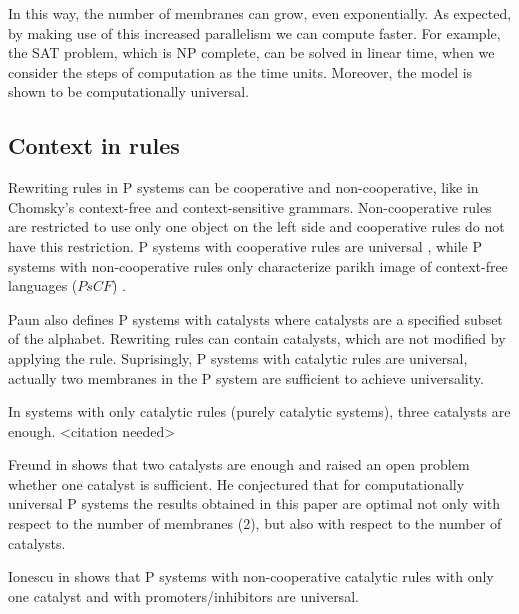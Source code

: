 In this way, the number of membranes can grow, even exponentially. As expected, by making use of this increased parallelism we can compute faster.
For example, the SAT problem, which is NP complete, can be solved in linear time, when we consider the steps of computation as the time units.
Moreover, the model is shown to be computationally universal.


\subsection{Context in rules} %
\label{sub:context_in_rules}


Rewriting rules in P systems can be cooperative and non-cooperative, like in Chomsky's context-free and context-sensitive grammars. Non-cooperative rules are restricted to use only one object on the left side and cooperative rules do not have this restriction.
P systems with cooperative rules are universal \cite{Paun98}, while P systems with non-cooperative rules only characterize parikh image of context-free languages ($PsCF$) \cite{Sburlan05dragos}.


Paun \cite{Paun98} also defines P systems with catalysts where catalysts are a specified subset of the alphabet. Rewriting rules can contain catalysts, which are not modified by applying the rule. Suprisingly, P systems with catalytic rules are universal, actually two membranes in the P system are sufficient to achieve universality.

In systems with only catalytic rules (purely catalytic systems), three catalysts are enough. <citation needed> %


Freund in \cite{Freund2005TwoCatalysts} shows that two catalysts are enough and raised an open problem whether one catalyst is sufficient. He conjectured that for computationally universal P systems the results obtained in this paper are optimal not only with respect to the number of membranes (2), but also with respect to the number of catalysts.



Ionescu in \cite{Ionescu:jucs_10_5:on_p_systems_with} shows that P systems with non-cooperative catalytic rules with only one catalyst and with promoters/inhibitors are universal.

